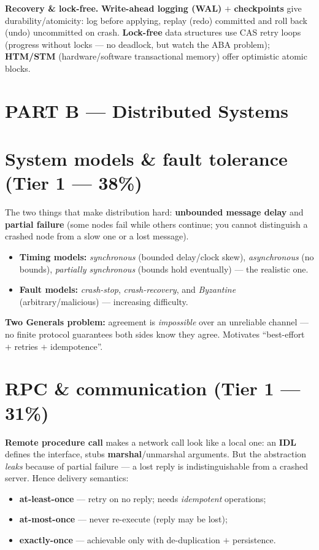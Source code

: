 \documentclass[11pt,a4paper]{article}
\begin{document}
\begin{useful}
\textbf{Recovery \& lock-free.} \textbf{Write-ahead logging (WAL)} $+$ \textbf{checkpoints} give durability/atomicity: log before applying, replay (redo) committed and roll back (undo) uncommitted on crash. \textbf{Lock-free} data structures use CAS retry loops (progress without locks --- no deadlock, but watch the ABA problem); \textbf{HTM/STM} (hardware/software transactional memory) offer optimistic atomic blocks.
\end{useful}

\section*{PART B --- Distributed Systems}

\section{System models \& fault tolerance (Tier 1 --- 38\%)}

\begin{must}
The two things that make distribution hard: \textbf{unbounded message delay} and \textbf{partial failure} (some nodes fail while others continue; you cannot distinguish a crashed node from a slow one or a lost message).
\begin{itemize}[leftmargin=*,itemsep=0pt]
  \item \textbf{Timing models:} \emph{synchronous} (bounded delay/clock skew), \emph{asynchronous} (no bounds), \emph{partially synchronous} (bounds hold eventually) --- the realistic one.
  \item \textbf{Fault models:} \emph{crash-stop}, \emph{crash-recovery}, and \emph{Byzantine} (arbitrary/malicious) --- increasing difficulty.
\end{itemize}
\textbf{Two Generals problem:} agreement is \emph{impossible} over an unreliable channel --- no finite protocol guarantees both sides know they agree. Motivates ``best-effort $+$ retries $+$ idempotence''.
\end{must}

\section{RPC \& communication (Tier 1 --- 31\%)}

\begin{must}
\textbf{Remote procedure call} makes a network call look like a local one: an \textbf{IDL} defines the interface, stubs \textbf{marshal}/unmarshal arguments. But the abstraction \emph{leaks} because of partial failure --- a lost reply is indistinguishable from a crashed server. Hence delivery semantics:
\begin{itemize}[leftmargin=*,itemsep=0pt]
  \item \textbf{at-least-once} --- retry on no reply; needs \emph{idempotent} operations;
  \item \textbf{at-most-once} --- never re-execute (reply may be lost);
  \item \textbf{exactly-once} --- achievable only with de-duplication $+$ persistence.
\end{itemize}
\end{must}
\end{document}
